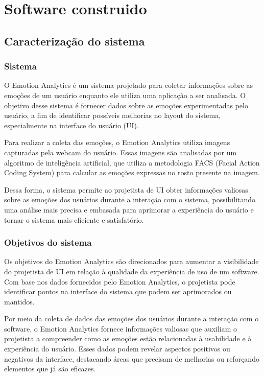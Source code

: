 \chapter{Software construido}

\section{Caracterização do sistema}

\subsection{Sistema}

O Emotion Analytics é um sistema projetado para coletar informações sobre as emoções de um usuário enquanto ele utiliza uma aplicação a ser analisada. O objetivo desse sistema é fornecer dados sobre as emoções experimentadas pelo usuário, a fim de identificar possíveis melhorias no layout do sistema, especialmente na interface do usuário (UI).

Para realizar a coleta das emoções, o Emotion Analytics utiliza imagens capturadas pela webcam do usuário. Essas imagens são analisadas por um algoritmo de inteligência artificial, que utiliza a metodologia FACS (Facial Action Coding System) para calcular as emoções expressas no rosto presente na imagem.

Dessa forma, o sistema permite ao projetista de UI obter informações valiosas sobre as emoções dos usuários durante a interação com o sistema, possibilitando uma análise mais precisa e embasada para aprimorar a experiência do usuário e tornar o sistema mais eficiente e satisfatório.

\subsection{Objetivos do sistema}

Os objetivos do Emotion Analytics são direcionados para aumentar a visibilidade do projetista de UI em relação à qualidade da experiência de uso de um software. Com base nos dados fornecidos pelo Emotion Analytics, o projetista pode identificar pontos na interface do sistema que podem ser aprimorados ou mantidos.

Por meio da coleta de dados das emoções dos usuários durante a interação com o software, o Emotion Analytics fornece informações valiosas que auxiliam o projetista a compreender como as emoções estão relacionadas à usabilidade e à experiência do usuário. Esses dados podem revelar aspectos positivos ou negativos da interface, destacando áreas que precisam de melhorias ou reforçando elementos que já são eficazes.

